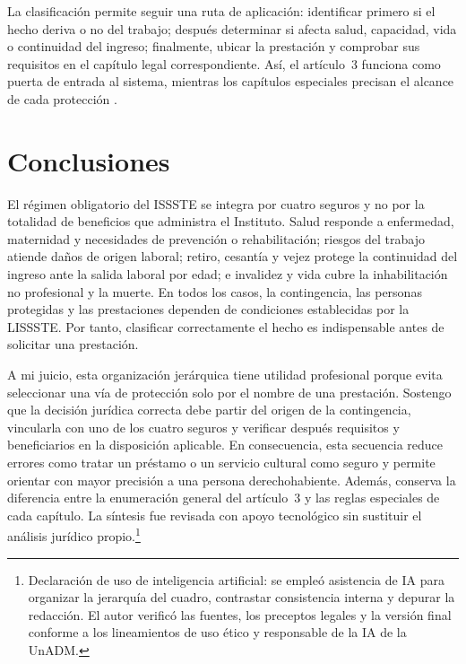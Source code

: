 \documentclass[12pt,letterpaper,oneside]{article}
\begin{document}
La clasificaci\'on permite seguir una ruta de aplicaci\'on: identificar primero si el hecho deriva o no del trabajo; despu\'es determinar si afecta salud, capacidad, vida o continuidad del ingreso; finalmente, ubicar la prestaci\'on y comprobar sus requisitos en el cap\'itulo legal correspondiente. As\'i, el art\'iculo~3 funciona como puerta de entrada al sistema, mientras los cap\'itulos especiales precisan el alcance de cada protecci\'on \citep{lissste2026,carrilloCastroIssste}.

\clearpage
\section{Conclusiones}

El r\'egimen obligatorio del ISSSTE se integra por cuatro seguros y no por la totalidad de beneficios que administra el Instituto. Salud responde a enfermedad, maternidad y necesidades de prevenci\'on o rehabilitaci\'on; riesgos del trabajo atiende da\~nos de origen laboral; retiro, cesant\'ia y vejez protege la continuidad del ingreso ante la salida laboral por edad; e invalidez y vida cubre la inhabilitaci\'on no profesional y la muerte. En todos los casos, la contingencia, las personas protegidas y las prestaciones dependen de condiciones establecidas por la LISSSTE. Por tanto, clasificar correctamente el hecho es indispensable antes de solicitar una prestaci\'on.

A mi juicio, esta organizaci\'on jer\'arquica tiene utilidad profesional porque evita seleccionar una v\'ia de protecci\'on solo por el nombre de una prestaci\'on. Sostengo que la decisi\'on jur\'idica correcta debe partir del origen de la contingencia, vincularla con uno de los cuatro seguros y verificar despu\'es requisitos y beneficiarios en la disposici\'on aplicable. En consecuencia, esta secuencia reduce errores como tratar un pr\'estamo o un servicio cultural como seguro y permite orientar con mayor precisi\'on a una persona derechohabiente. Adem\'as, conserva la diferencia entre la enumeraci\'on general del art\'iculo~3 y las reglas especiales de cada cap\'itulo. La s\'intesis fue revisada con apoyo tecnol\'ogico sin sustituir el an\'alisis jur\'idico propio.\footnote{Declaraci\'on de uso de inteligencia artificial: se emple\'o asistencia de IA para organizar la jerarqu\'ia del cuadro, contrastar consistencia interna y depurar la redacci\'on. El autor verific\'o las fuentes, los preceptos legales y la versi\'on final conforme a los lineamientos de uso \'etico y responsable de la IA de la UnADM.}

\clearpage
\nocite{cpeum2026,lissste2026,bricenoRuiz2011,ramirezChavero2009,carrilloCastroIssste,gonzalezCarvallo2024,isssteSitio2026}

\end{document}
